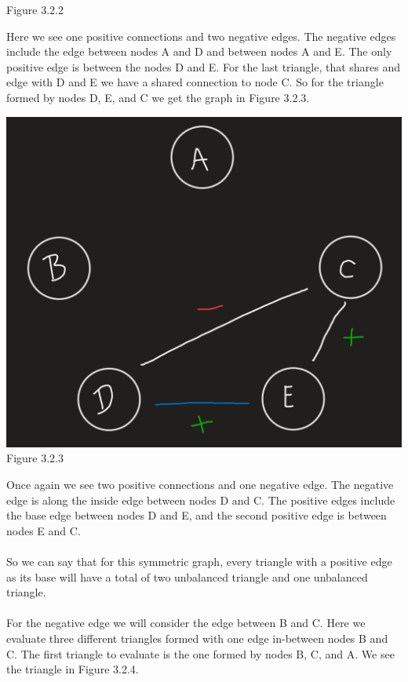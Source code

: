 \documentclass[11pt]{article}
\begin{document}
\begin{enumerate}
{\begin{center}
	Figure 3.2.2\\
\end{center}
Here we see one positive connections and two negative edges. The negative edges include the edge between nodes A and D and between nodes A and E.  The only positive edge is between the nodes D and E. For the last triangle, that shares and edge with D and E we have a shared connection to node C.  So for the triangle formed by nodes D, E, and C we get the graph in Figure 3.2.3.
\begin{center}
	\includegraphics[scale=0.5]{Figure_3_2_3}\\
	Figure 3.2.3\\
\end{center}
Once again we see two positive connections and one negative edge. The negative edge is along the inside edge between nodes D and C.  The positive edges include the base edge between nodes D and E, and the second positive edge is between nodes E and C.\\\\
So we can say that for this symmetric graph, every triangle with a positive edge as its base will have a total of two unbalanced triangle and one unbalanced triangle.\\\\
For the negative edge we will consider the edge between B and C.  Here we evaluate three different triangles formed with one edge in-between nodes B and C. The first triangle to evaluate is the one formed by nodes B, C, and A.  We see the triangle in Figure 3.2.4. 
}
\end{enumerate}
\end{document}
